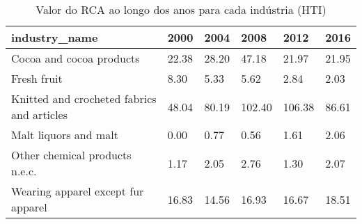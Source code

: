 \begin{table}
\centering
\caption{Valor do RCA ao longo dos anos para cada indústria (HTI)}
\begin{tabular}{p{6cm}p{1.5cm}p{1.5cm}p{1.5cm}p{1.5cm}p{1.5cm}}
\toprule
                             industry\_name &  2000 &  2004 &   2008 &   2012 &  2016 \\
\midrule
                  Cocoa and cocoa products & 22.38 & 28.20 &  47.18 &  21.97 & 21.95 \\
                               Fresh fruit &  8.30 &  5.33 &   5.62 &   2.84 &  2.03 \\
Knitted and crocheted fabrics and articles & 48.04 & 80.19 & 102.40 & 106.38 & 86.61 \\
                     Malt liquors and malt &  0.00 &  0.77 &   0.56 &   1.61 &  2.06 \\
            Other chemical products n.e.c. &  1.17 &  2.05 &   2.76 &   1.30 &  2.07 \\
        Wearing apparel except fur apparel & 16.83 & 14.56 &  16.93 &  16.67 & 18.51 \\
\bottomrule
\end{tabular}
\end{table}
